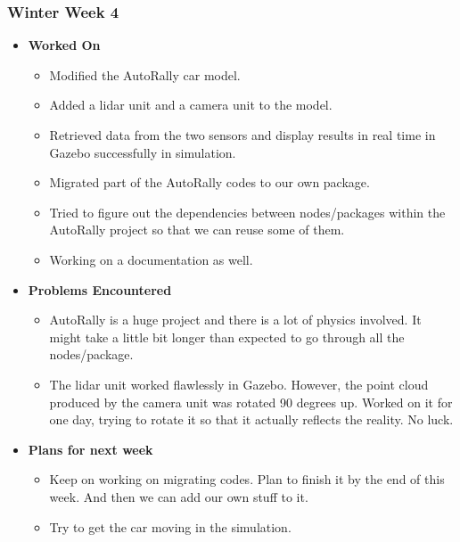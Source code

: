 \documentclass{article}
\begin{document}
\subsubsection{Winter Week 4}
\begin{itemize}
    \item {\textbf{Worked On}}
    \begin{itemize}
      \item Modified the AutoRally car model.
      \item Added a lidar unit and a camera unit to the model.
      \item Retrieved data from the two sensors and display
      results in real time in Gazebo successfully in simulation.
      \item Migrated part of the AutoRally codes to our own package.
      \item Tried to figure out the dependencies between nodes/packages
      within the AutoRally project so that we can reuse some of them.
      \item Working on a documentation as well.
    \end{itemize}

    \item {\textbf{Problems Encountered}}
    \begin{itemize}
      \item AutoRally is a huge project and there is a lot of physics
      involved. It might take a little bit longer than expected to go
      through all the nodes/package.
      \item The lidar unit worked flawlessly in Gazebo. However, the point
      cloud produced by the camera unit was rotated 90 degrees up. Worked
      on it for one day, trying to rotate it so that it actually reflects
      the reality. No luck.
    \end{itemize}

    \item{\textbf{Plans for next week}}
    \begin{itemize}
      \item Keep on working on migrating codes. Plan to finish it by the end
      of this week. And then we can add our own stuff to it.
      \item Try to get the car moving in the simulation.
    \end{itemize}

\end{itemize}
\end{document}
